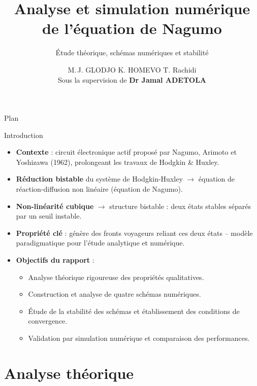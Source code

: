 \documentclass[10pt]{beamer}
\title[Équation de Nagumo]{Analyse et simulation numérique\\de l'équation de Nagumo}
\subtitle{Étude théorique, schémas numériques et stabilité}
\author[GLODJO \& HOMEVO \& AGRO]{M.\,J. GLODJO \quad K. HOMEVO \quad  T. Rachidi \\[4pt]
  \small Sous la supervision de \textbf{Dr Jamal ADETOLA}}
\institute[ENSGMM -- UNSTIM]{TP de Problèmes instationnaires -- ENSGMM}
\date{}
\newcommand{\framewithtitle}[1]{%
\begin{frame}[c]{}
  \begin{center}
  \Huge
    \begin{tcolorbox}
      \emph{
        \espace
        \begin{center}
          \textcolor{black}{#1}
        \end{center}
        \espace
      }
    \end{tcolorbox}
  \end{center}
\end{frame}
}
\begin{document}

\begin{frame}
  \titlepage
\end{frame}

\begin{frame}{Plan}
  \tableofcontents[hideallsubsections]
\end{frame}

\begin{frame}{Introduction}
\begin{itemize}
    \item \textbf{Contexte} : circuit électronique actif proposé par Nagumo, Arimoto et Yoshizawa (1962), prolongeant les travaux de Hodgkin \& Huxley.
    \item \textbf{Réduction bistable} du système de Hodgkin-Huxley $\rightarrow$ équation de réaction-diffusion non linéaire (équation de Nagumo).
    \item \textbf{Non-linéarité cubique} $\rightarrow$ structure bistable : deux états stables séparés par un seuil instable.
    \item \textbf{Propriété clé} : génère des fronts voyageurs reliant ces deux états – modèle paradigmatique pour l'étude analytique et numérique.
    \item \textbf{Objectifs du rapport} :
    \begin{itemize}
        \item Analyse théorique rigoureuse des propriétés qualitatives.
        \item Construction et analyse de quatre schémas numériques.
        \item Étude de la stabilité des schémas et établissement des conditions de convergence.
        \item Validation par simulation numérique et comparaison des performances.
    \end{itemize}
\end{itemize}
\end{frame}

\section{Analyse théorique}
\framewithtitle{Analyse théorique}
\end{document}
